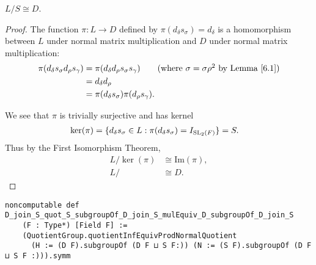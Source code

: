 \begin{lemma}
\label{SpecialSubgroups.D_join_S_quot_S_subgroupOf_D_join_S_mulEquiv_D_subgroupOf_D_join_S}
\leanok
    $L / S \cong D$.
\end{lemma}
\begin{proof} 
\leanok
The function $\pi: L \rightarrow D$ defined by $\pi(d_\delta s_\sigma) = d_\delta$ is a homomorphism between $L$ under normal matrix multiplication and $D$ under normal matrix multiplication:
\begin{align*} \pi(d_\delta s_\sigma d_\rho s_\gamma) &= \pi(d_\delta d_\rho s_\sigma s_\gamma) \tag{where $\sigma = \sigma \rho^{2}$ by Lemma \ref{6.1}}
\\ &= d_\delta d_\rho
\\ &= \pi(d_\delta s_\sigma)\pi(d_\rho s_\gamma).
\end{align*}

We see that $\pi$ is trivially surjective and has kernel
\begin{align*}  \ker(\pi) &= \{ d_\delta s_\sigma \in L : \pi(d_\delta s_\sigma) = I_{\operatorname{SL}_2(F)}\} = S.
\end{align*}
Thus by the First Isomorphism Theorem,
\begin{align*} L / \ker(\pi) &\cong \text{Im}(\pi), \\
L / &\cong D.
\end{align*}
\end{proof}
\begin{footnotesize}
\begin{verbatim}
noncomputable def D_join_S_quot_S_subgroupOf_D_join_S_mulEquiv_D_subgroupOf_D_join_S
    (F : Type*) [Field F] :=
    (QuotientGroup.quotientInfEquivProdNormalQuotient
      (H := (D F).subgroupOf (D F ⊔ S F:)) (N := (S F).subgroupOf (D F ⊔ S F :))).symm
\end{verbatim}
\end{footnotesize}


